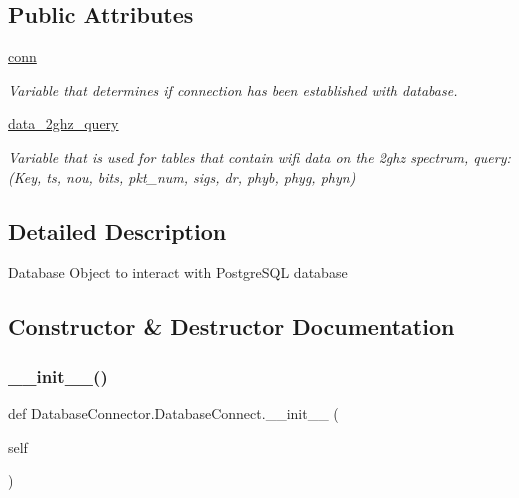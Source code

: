 \subsection*{Public Attributes}
\begin{DoxyCompactItemize}
\item 
\mbox{\hyperlink{classDatabaseConnector_1_1DatabaseConnect_a032674c05648a8ba31c2ef9a1363338e}{conn}}
\begin{DoxyCompactList}\small\item\em Variable that determines if connection has been established with database. \end{DoxyCompactList}\item 
\mbox{\hyperlink{classDatabaseConnector_1_1DatabaseConnect_aa3b98ea56e1017172f5cee5e2369e667}{data\+\_\+2ghz\+\_\+query}}
\begin{DoxyCompactList}\small\item\em Variable that is used for tables that contain wifi data on the 2ghz spectrum, query\+: (Key, ts, nou, bits, pkt\+\_\+num, sigs, dr, phyb, phyg, phyn) \end{DoxyCompactList}\end{DoxyCompactItemize}


\subsection{Detailed Description}
\begin{DoxyVerb}Database Object to interact with PostgreSQL database\end{DoxyVerb}
 

\subsection{Constructor \& Destructor Documentation}
\mbox{\label{classDatabaseConnector_1_1DatabaseConnect_adafc2b78cab3df24b9f1f88990f88ac7}} 
\subsubsection{\texorpdfstring{\+\_\+\+\_\+init\+\_\+\+\_\+()}{\_\_init\_\_()}}
{\footnotesize\ttfamily def Database\+Connector.\+Database\+Connect.\+\_\+\+\_\+init\+\_\+\+\_\+ (\begin{DoxyParamCaption}\item[{}]{self }\end{DoxyParamCaption})}


